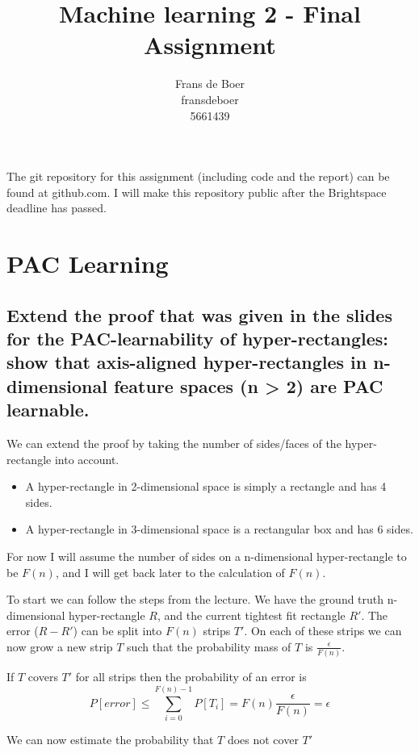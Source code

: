 \documentclass[11pt,a4paper]{article}
\title{Machine learning 2 - Final Assignment}
\author{
    Frans de Boer \\
    fransdeboer \\
    5661439 \\
}
\begin{document}
\maketitle

The git repository for this assignment (including code and the report) can be found at github.com. I will make this repository public after the Brightspace deadline has passed.

\section{PAC Learning}

\subsection{Extend the proof that was given in the slides for the PAC-learnability of hyper-rectangles:
show that axis-aligned hyper-rectangles in n-dimensional feature spaces (n > 2) are PAC
learnable.}
  
We can extend the proof by taking the number of sides/faces of the hyper-rectangle into account.
\begin{itemize}
    \item A hyper-rectangle in 2-dimensional space is simply a rectangle and has 4 sides.
    \item A hyper-rectangle in 3-dimensional space is a rectangular box and has 6 sides.
\end{itemize}
For now I will assume the number of sides on a n-dimensional hyper-rectangle to be $F(n)$, and I will get back later to the calculation of $F(n)$.

To start we can follow the steps from the lecture. We have the ground truth n-dimensional hyper-rectangle $R$, and the current tightest fit rectangle $R'$. The error ($R - R'$) can be split into $F(n)$ strips $T'$. On each of these strips we can now grow a new strip $T$ such that the probability mass of $T$ is $\frac{\epsilon}{F(n)}$.

If $T$ covers $T'$ for all strips then the probability of an error is
\begin{equation}
    \label{eq:total_error}
    P[error] \leq \sum_{i=0}^{F(n)-1}P[T_i] = F(n)\frac{\epsilon}{F(n)} = \epsilon
\end{equation}

We can now estimate the probability that $T$ does not cover $T'$
\end{document}
